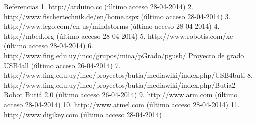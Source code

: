 

Referencias
1. http://arduino.cc (último acceso 28-04-2014)
2. http://www.fischertechnik.de/en/home.aspx (último acceso 28-04-2014)
3. http://www.lego.com/en-us/mindstorms (último acceso 28-04-2014)
4. http://mbed.org (último acceso 28-04-2014)
5. http://www.robotis.com/xe (último acceso 28-04-2014)
6. http://www.fing.edu.uy/inco/grupos/mina/pGrado/pgusb/ Proyecto de grado USB4all (último acceso 26-04-2014)
7. http://www.fing.edu.uy/inco/proyectos/butia/mediawiki/index.php/USB4buti%
8. http://www.fing.edu.uy/inco/proyectos/butia/mediawiki/index.php/Butia2 Robot Butiá 2.0 (último acceso 26-04-2014)
9. http://www.arm.com (último acceso 28-04-2014)
10. http://www.atmel.com (último acceso 28-04-2014)
11. http://www.digikey.com (último acceso 28-04-2014)

